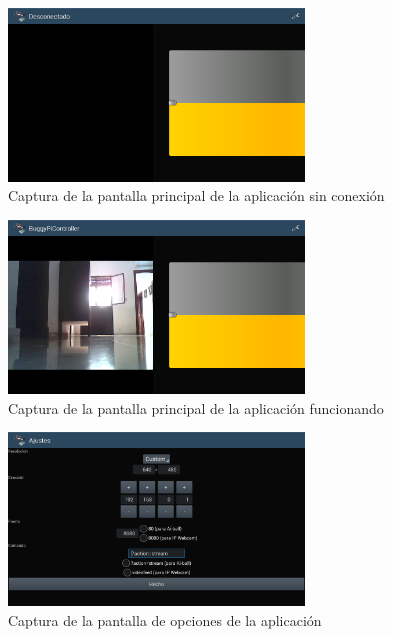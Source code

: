 \documentclass{pclass}
\begin{document}
\begin{itemize}
\begin{itemize}
	\begin{figure}[H]
		\centering
		\includegraphics[width=0.7\textwidth]{img/sin_conexion}
		\caption{Captura de la pantalla principal de la aplicación sin conexión}
		\label{fig:capturaSinConexion}
	\end{figure}

	\begin{figure}[H]
		\centering
		\includegraphics[width=0.7\textwidth]{img/conectado}
		\caption{Captura de la pantalla principal de la aplicación funcionando}
		\label{fig:capturaConConexion}
	\end{figure}
	
	\begin{figure}[H]
		\centering
		\includegraphics[width=0.7\textwidth]{img/opciones}
		\caption{Captura de la pantalla de opciones de la aplicación}
		\label{fig:capturaOpciones}
	\end{figure}
	
	
	\medskip
	
\end{itemize}
\end{itemize}
\end{document}
